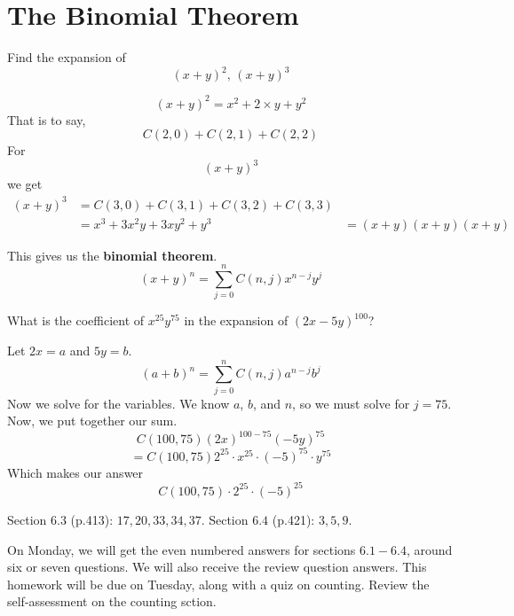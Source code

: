 \section{The Binomial Theorem}
\begin{ex}
  Find the expansion of
  \[(x+y)^2,\, (x+y)^3\]
  \begin{sol}
    \[(x+y)^2 = x^2 + 2\times y+ y^2\]
    That is to say,
    \[ C(2, 0)+ C(2, 1)+ C(2,2) \]
    For
    \[(x+y)^3\]
    we get
    \begin{align*}
      (x+y)^3&=C(3,0)+C(3,1)+C(3,2)+C(3,3) \\
      &= x^3 + 3x^2 y + 3 x y^2 + y^3
       &= (x+y)(x+y)(x+y)
    \end{align*}
  \end{sol}
\end{ex}
This gives us the \textbf{binomial theorem}.
\[ (x+y)^n = \sum^n_{j=0} C(n, j)x^{n-j}y^j \]
\begin{ex}
  What is the coefficient of $x^{25}y^{75}$ in the expansion of $(2x-5y)^{100}$?
  \begin{sol}
    Let $2x=a$ and $5y =b$.
    \[ (a+b)^n= \sum^n_{j=0} C(n,j) a^{n-j} b^j \]
    Now we solve for the variables. We know $a$, $b$, and $n$, so we must solve for
    $j=75$.
    Now, we put together our sum.
    \[ C(100,75)(2x)^{100-75}(-5y)^{75} \]
    \[ = C(100,75) 2^{25} \cdot x^{25} \cdot (-5)^{75} \cdot y^{75} \]
    Which makes our answer
    \[ C(100, 75) \cdot 2^{25}\cdot(-5)^{25}\]
  \end{sol}
\end{ex}
\begin{homework}
  Section $6.3$ (p.413): $17,20,33,34,37$.
  Section $6.4$ (p.421): $3, 5, 9$.

  On Monday, we will get the even numbered answers for sections $6.1-6.4$,
  around six or seven questions. We will also receive the review question
  answers. This homework will be due on Tuesday, along with a quiz on counting.
  Review the self-assessment on the counting sction.
\end{homework}

